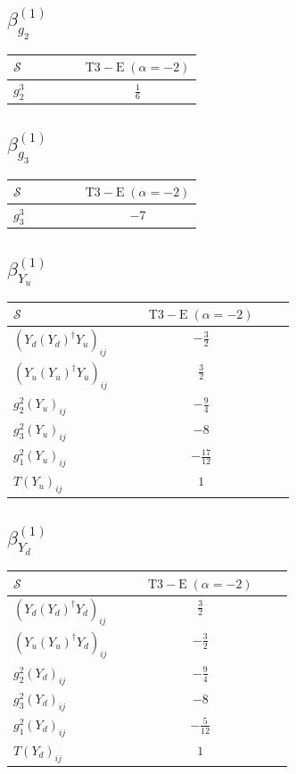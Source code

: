 \documentclass[9pt]{article}
\begin{document}
\subsection*{$ \beta_{g_2}^{(1)} $}
\begin{longtable}{@{}p{0.38\linewidth}c@{}}
\toprule
$\mathcal{S}$ & $ \mathrm{T3-E}\;(\alpha=-2) $ \\
\midrule
$ g_2^3 $ & $ \frac{1}{6} $ \\
\bottomrule
\end{longtable}
\subsection*{$ \beta_{g_3}^{(1)} $}
\begin{longtable}{@{}p{0.38\linewidth}c@{}}
\toprule
$\mathcal{S}$ & $ \mathrm{T3-E}\;(\alpha=-2) $ \\
\midrule
$ g_3^3 $ & $ -7 $ \\
\bottomrule
\end{longtable}
\subsection*{$ \beta_{Y_u}^{(1)} $}
\begin{longtable}{@{}p{0.38\linewidth}c@{}}
\toprule
$\mathcal{S}$ & $ \mathrm{T3-E}\;(\alpha=-2) $ \\
\midrule
$ (Y_d (Y_d)^{\dagger} Y_u)_{ij} $ & $ - \frac{3}{2} $ \\
$ (Y_u (Y_u)^{\dagger} Y_u)_{ij} $ & $ \frac{3}{2} $ \\
$ g_2^2 (Y_u)_{ij} $ & $ - \frac{9}{4} $ \\
$ g_3^2 (Y_u)_{ij} $ & $ -8 $ \\
$ g_1^2 (Y_u)_{ij} $ & $ - \frac{17}{12} $ \\
$ T (Y_u)_{ij} $ & $ 1 $ \\
\bottomrule
\end{longtable}
\subsection*{$ \beta_{Y_d}^{(1)} $}
\begin{longtable}{@{}p{0.38\linewidth}c@{}}
\toprule
$\mathcal{S}$ & $ \mathrm{T3-E}\;(\alpha=-2) $ \\
\midrule
$ (Y_d (Y_d)^{\dagger} Y_d)_{ij} $ & $ \frac{3}{2} $ \\
$ (Y_u (Y_u)^{\dagger} Y_d)_{ij} $ & $ - \frac{3}{2} $ \\
$ g_2^2 (Y_d)_{ij} $ & $ - \frac{9}{4} $ \\
$ g_3^2 (Y_d)_{ij} $ & $ -8 $ \\
$ g_1^2 (Y_d)_{ij} $ & $ - \frac{5}{12} $ \\
$ T (Y_d)_{ij} $ & $ 1 $ \\
\bottomrule
\end{longtable}
\end{document}
